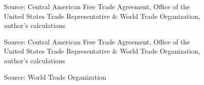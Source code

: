 \documentclass[12pt]{article}
\begin{document}
\begin{figure}[H]
%
\caption{\label{fig:Graph2}}
Source: Central American Free Trade Agreement, Office of the United States Trade Representative \&
World Trade Organization, author's calculations
\end{figure}

\begin{figure}[H]
%
\caption{\label{fig:Graph3}}
Source: Central American Free Trade Agreement, Office of the United States Trade Representative \&
World Trade Organization, author's calculations
\end{figure}

\begin{figure}[H]
%
\caption{\label{fig:Graph4}}
Source: World Trade Organization
\end{figure}
\end{document}
